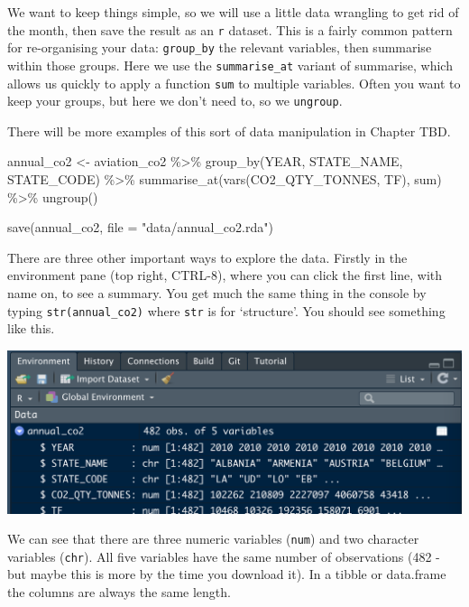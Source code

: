 \documentclass[
]{book}
\newenvironment{Shaded}{\begin{snugshade}}{\end{snugshade}}
\newcommand{\AttributeTok}[1]{\textcolor[rgb]{0.77,0.63,0.00}{#1}}
\newcommand{\FunctionTok}[1]{\textcolor[rgb]{0.00,0.00,0.00}{#1}}
\newcommand{\NormalTok}[1]{#1}
\newcommand{\OtherTok}[1]{\textcolor[rgb]{0.56,0.35,0.01}{#1}}
\newcommand{\SpecialCharTok}[1]{\textcolor[rgb]{0.00,0.00,0.00}{#1}}
\newcommand{\StringTok}[1]{\textcolor[rgb]{0.31,0.60,0.02}{#1}}
\begin{document}
We want to keep things simple, so we will use a little data wrangling to get rid of the month, then save the result as an \texttt{r} dataset. This is a fairly common pattern for re-organising your data: \texttt{group\_by} the relevant variables, then summarise within those groups. Here we use the \texttt{summarise\_at} variant of summarise, which allows us quickly to apply a function \texttt{sum} to multiple variables. Often you want to keep your groups, but here we don't need to, so we \texttt{ungroup}.

There will be more examples of this sort of data manipulation in Chapter TBD.

\begin{Shaded}
\begin{Highlighting}[]
\NormalTok{annual\_co2 }\OtherTok{\textless{}{-}}\NormalTok{ aviation\_co2 }\SpecialCharTok{\%\textgreater{}\%}
  \FunctionTok{group\_by}\NormalTok{(YEAR, STATE\_NAME, STATE\_CODE) }\SpecialCharTok{\%\textgreater{}\%}
  \FunctionTok{summarise\_at}\NormalTok{(}\FunctionTok{vars}\NormalTok{(CO2\_QTY\_TONNES, TF), sum) }\SpecialCharTok{\%\textgreater{}\%}
  \FunctionTok{ungroup}\NormalTok{()}

\FunctionTok{save}\NormalTok{(annual\_co2, }\AttributeTok{file =} \StringTok{"data/annual\_co2.rda"}\NormalTok{)}
\end{Highlighting}
\end{Shaded}

There are three other important ways to explore the data. Firstly in the environment pane (top right, CTRL-8), where you can click the first line, with name on, to see a summary. You get much the same thing in the console by typing \texttt{str(annual\_co2)} where \texttt{str} is for `structure'. You should see something like this.

\includegraphics{images/CO2inEnvironment.png}

We can see that there are three numeric variables (\texttt{num}) and two character variables (\texttt{chr}). All five variables have the same number of observations (482 - but maybe this is more by the time you download it). In a tibble or data.frame the columns are always the same length.
\end{document}
